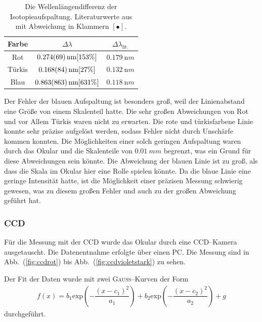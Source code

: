 \documentclass[sn-mathphys-num,iicol]{sn-jnl}
\theoremstyle{thmstyleone}
\theoremstyle{thmstyletwo}
\theoremstyle{thmstylethree}
\begin{document}
\begin{table}[h]
        \begin{tabular}{ccc}
                Farbe & $\Delta \lambda $ & $\Delta \lambda _\text{lit.}$ \\
                \hline
                Rot & $\SI{0.274+-0.069}{\nano m}[153\%]$ & $\SI{0.179}{\nano m}$ \\
                Türkis & $\SI{0.168+-0.084}{\nano m}[27\%]$ & $\SI{0.132}{\nano m}$ \\
                Blau & $\SI{0.863+-0.863}{\nano m}[631\%]$ & $\SI{0.118}{\nano m}$ 
        \end{tabular}
        \caption{Die Wellenlängendifferenz der Isotopieaufspaltung. Literaturwerte aus \cite{LeyboldBalmerserieBeobachtung} mit Abweichung in Klammern $[\bullet ]$.} \label{tab:isotopie_okular}
\end{table}
Der Fehler der blauen Aufspaltung ist besonders groß, weil der Linienabstand eine Größe von einem Skalenteil hatte.
Die sehr großen Abweichungen von Rot und vor Allem Türkis waren nicht zu erwarten.
Die rote und türkisfarbene Linie konnte sehr präzise aufgelöst werden, sodass Fehler nicht durch Unschärfe kommen konnten.
Die Möglichkeiten einer solch geringen Aufspaltung waren durch das Okular und die Skalenteile von $\SI{0.01}{mm}$ begrenzt, was ein Grund für diese Abweichungen sein könnte.
Die Abweichung der blauen Linie ist zu groß, als dass die Skala im Okular hier eine Rolle spielen könnte.
Da die blaue Linie eine geringe Intensität hatte, ist die Möglichkeit einer präzisen Messung schwierig gewesen, was zu diesem großen Fehler und auch zu der großen Abweichung geführt hat.

\subsubsection{CCD}
Für die Messung mit der CCD wurde das Okular durch eine CCD--Kamera ausgetauscht.
Die Datenentnahme erfolgte über einen PC.
Die Messung sind in Abb.\ (\ref{fig:ccdrot}) bis Abb.\ (\ref{fig:ccdvioletstark}) zu sehen.

Der Fit der Daten wurde mit zwei \textsc{Gauss}--Kurven der Form
\begin{align} 
        f\left(x\right)=b_1\text{exp}\left(-\dfrac{\left(x-c_1\right)^2}{a_1}\right)+b_2\text{exp}\left(-\dfrac{\left(x-c_2\right)^2}{a_2}\right)+g
\end{align} 
durchgeführt.
\end{document}

